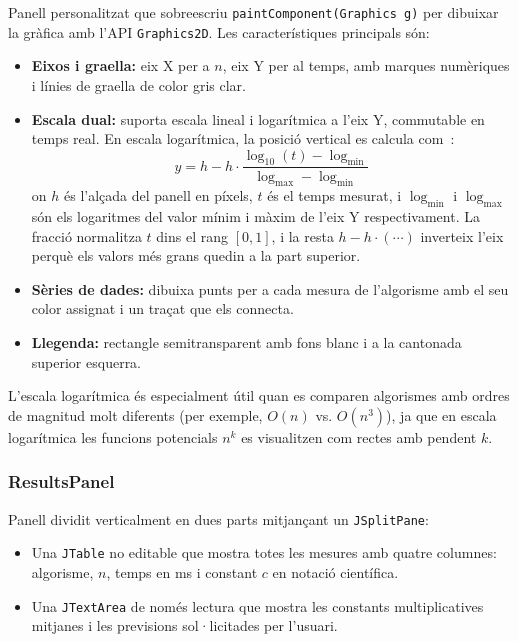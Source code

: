 \documentclass[conference,compsoc]{IEEEtran}
\begin{document}
Panell personalitzat que sobreescriu \texttt{paintComponent(Graphics g)}
per dibuixar la gràfica amb l'API \texttt{Graphics2D}. Les
característiques principals són:

\begin{itemize}
    \item \textbf{Eixos i graella:} eix X per a $n$, eix Y per al temps,
          amb marques numèriques i línies de graella de color gris clar.
    \item \textbf{Escala dual:} suporta escala lineal i logarítmica a
          l'eix Y, commutable en temps real. En escala logarítmica, la
          posició vertical es calcula com~\cite{ref_minmax_so}:
          \begin{equation}
          y = h - h \cdot \frac{\log_{10}(t) - \log_{\min}}{\log_{\max} - \log_{\min}}
          \end{equation}
          on $h$ és l'alçada del panell en píxels, $t$ és el temps mesurat,
          i $\log_{\min}$ i $\log_{\max}$ són els logaritmes del valor mínim
          i màxim de l'eix Y respectivament. La fracció normalitza $t$ dins
          el rang $[0, 1]$, i la resta $h - h\cdot(\cdots)$ inverteix l'eix
          perquè els valors més grans quedin a la part superior.
    \item \textbf{Sèries de dades:} dibuixa punts per a
          cada mesura de l'algorisme amb el seu color assignat i un traçat que els connecta.
    \item \textbf{Llegenda:} rectangle semitransparent amb fons blanc i a la cantonada superior esquerra.
\end{itemize}

L'escala logarítmica és especialment útil quan es comparen algorismes
amb ordres de magnitud molt diferents (per exemple, $O(n)$ vs. $O(n^3)$),
ja que en escala logarítmica les funcions potencials $n^k$ es visualitzen
com rectes amb pendent $k$.

\subsubsection{ResultsPanel}

Panell dividit verticalment en dues parts mitjançant un \texttt{JSplitPane}:
\begin{itemize}
    \item Una \texttt{JTable} no editable que mostra totes les mesures
          amb quatre columnes: algorisme, $n$, temps en ms i constant
          $c$ en notació científica.
    \item Una \texttt{JTextArea} de només lectura 
          que mostra les constants multiplicatives mitjanes i les
          previsions sol·licitades per l'usuari.
\end{itemize}
\end{document}
